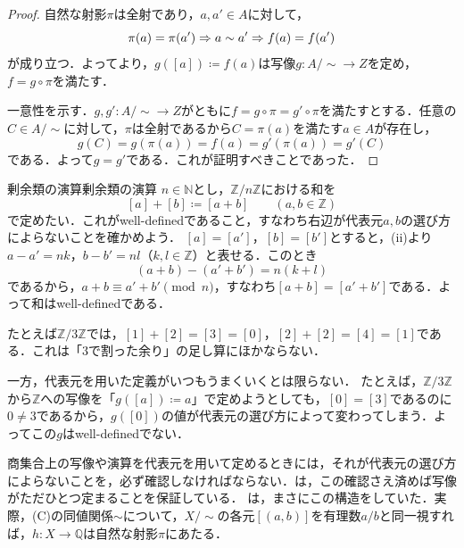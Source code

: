 \begin{tleftbar}
  \begin{proof}
    自然な射影$\pi$は全射であり，$a, a' \in A$に対して，
    \[
      \pi(a) = \pi(a') \mathrel{\Rightarrow} a \sim a' \mathrel{\Rightarrow} f(a) = f(a')
    \]
    が成り立つ．よってより，$g([a]) \coloneqq f(a)$は写像$g \colon A / {\sim} \to Z$を定め，$f = g \circ \pi$を満たす．

    一意性を示す．$g, g' \colon A / {\sim} \to Z$がともに$f = g \circ \pi = g' \circ \pi$を満たすとする．任意の$C \in A / {\sim}$に対して，$\pi$は全射であるから$C = \pi(a)$を満たす$a \in A$が存在し，
    \[
      g(C) = g(\pi(a)) = f(a) = g'(\pi(a)) = g'(C)
    \]
    である．よって$g = g'$である．これが証明すべきことであった．
  \end{proof}
\end{tleftbar}

\begin{example}{剰余類の演算}{剰余類の演算}
  $n \in \mathbb{N}$とし，$\mathbb{Z}/n\mathbb{Z}$における和を
  \[
    [a] + [b] \coloneqq [a + b] \qquad (a, b \in \mathbb{Z})
  \]
  で定めたい．これがwell-definedであること，すなわち右辺が代表元$a,b$の選び方によらないことを確かめよう．
  $[a] = [a']$，$[b] = [b']$とすると，(ii)より$a - a' = nk$，$b - b' = nl$（$k, l \in \mathbb{Z}$）と表せる．このとき
  \[
    (a + b) - (a' + b') = n(k + l)
  \]
  であるから，$a + b \equiv a' + b' \pmod{n}$，すなわち$[a + b] = [a' + b']$である．よって和はwell-definedである．

  たとえば$\mathbb{Z}/3\mathbb{Z}$では，$[1] + [2] = [3] = [0]$，$[2] + [2] = [4] = [1]$である．これは「$3$で割った余り」の足し算にほかならない．
\end{example}

一方，代表元を用いた定義がいつもうまくいくとは限らない．
たとえば，$\mathbb{Z}/3\mathbb{Z}$から$\mathbb{Z}$への写像を「$g([a]) \coloneqq a$」で定めようとしても，$[0] = [3]$であるのに$0 \ne 3$であるから，$g([0])$の値が代表元の選び方によって変わってしまう．よってこの$g$はwell-definedでない．

\begin{remark}[代表元を用いた定義の確認]
  商集合上の写像や演算を代表元を用いて定めるときには，それが代表元の選び方によらないことを，必ず確認しなければならない．は，この確認さえ済めば写像がただひとつ定まることを保証している．
  は，まさにこの構造をしていた．実際，(C)の同値関係$\sim$について，$X / {\sim}$の各元$[(a, b)]$を有理数$a/b$と同一視すれば，$h \colon X \to \mathbb{Q}$は自然な射影$\pi$にあたる．
\end{remark}

